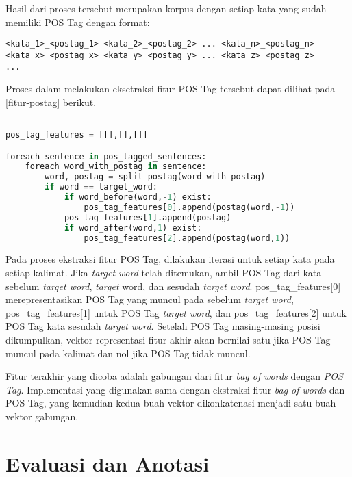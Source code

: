 Hasil dari proses tersebut merupakan korpus dengan setiap kata yang sudah memiliki POS Tag dengan format:

\begin{lstlisting}[backgroundcolor = \color{white}]
<kata_1>_<postag_1> <kata_2>_<postag_2> ... <kata_n>_<postag_n>
<kata_x> <postag_x> <kata_y>_<postag_y> ... <kata_z>_<postag_z>
...
\end{lstlisting}

Proses dalam melakukan eksetraksi fitur POS Tag tersebut dapat dilihat pada \ref{fitur-postag} berikut.

\begin{lstlisting}[language=python,caption={Ekstraksi Fitur POS Tag}, label={fitur-postag}]

pos_tag_features = [[],[],[]]

foreach sentence in pos_tagged_sentences:
	foreach word_with_postag in sentence:
		word, postag = split_postag(word_with_postag)
		if word == target_word:
			if word_before(word,-1) exist:
				pos_tag_features[0].append(postag(word,-1))
			pos_tag_features[1].append(postag)
			if word_after(word,1) exist:
				pos_tag_features[2].append(postag(word,1))

\end{lstlisting}

Pada proses ekstraksi fitur POS Tag, dilakukan iterasi untuk setiap kata pada setiap kalimat. Jika \textit{target word} telah ditemukan, ambil POS Tag dari kata sebelum \textit{target word}, \textit{target} word, dan sesudah \textit{target word}. pos\_tag\_features[0] merepresentasikan POS Tag yang muncul pada sebelum \textit{target word}, pos\_tag\_features[1] untuk POS Tag \textit{target word}, dan pos\_tag\_features[2] untuk POS Tag kata sesudah \textit{target word}. Setelah POS Tag masing-masing posisi dikumpulkan, vektor representasi fitur akhir akan bernilai satu jika POS Tag muncul pada kalimat dan nol jika POS Tag tidak muncul. 

Fitur terakhir yang dicoba adalah gabungan dari fitur \textit{bag of words} dengan \textit{POS Tag}. Implementasi yang digunakan sama dengan ekstraksi fitur \textit{bag of words} dan POS Tag, yang kemudian kedua buah vektor dikonkatenasi menjadi satu buah vektor gabungan.

\section{Evaluasi dan Anotasi}

